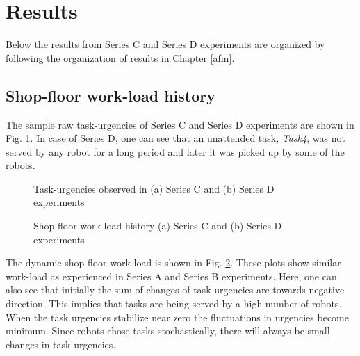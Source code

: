 \section{Results}
\label{sec:results}
Below the results from Series C and Series D experiments are organized by following the organization of results in Chapter \ref{afm}.
\subsection*{Shop-floor work-load history}
The sample raw task-urgencies of Series C and Series D experiments are shown in Fig. \ref{fig:raw-urgencies-SC-SD}. In case of Series D, one can see that an unattended task, \textit{Task4}, was not served by any robot for a long period and later it was picked up by some of the robots. 
\begin{figure}
\centering
\hspace*{0.5cm}
\newline
{}
\caption{\small Task-urgencies observed in (a) Series C and (b) Series D experiments}
\label{fig:raw-urgencies-SC-SD} 
\end{figure}
\begin{figure}
\centering
\hspace*{0.5cm}
\newline
{}
\caption{\small Shop-floor work-load history (a) Series C and (b) Series D experiments}
\label{fig:workload-SC-SD} 
\end{figure}
The dynamic shop floor work-load is shown in Fig. \ref{fig:workload-SC-SD}. These plots show similar work-load as experienced in Series A and Series B experiments. Here, one can also see that initially the sum of changes of task urgencies are towards negative direction. This implies that tasks are being served by a high number of robots. When the task urgencies stabilize near zero the fluctuations in urgencies become minimum. Since robots chose tasks stochastically, there will always be  small changes in task urgencies.
%

